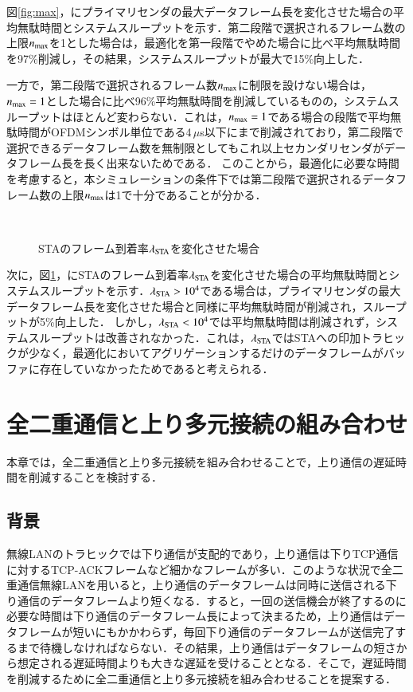 \documentclass[technicalreport]{ieicej}
\begin{document}
		図\ref{fig:max}，にプライマリセンダの最大データフレーム長を変化させた場合の平均無駄時間とシステムスループットを示す．第二段階で選択されるフレーム数の上限$n_{\rm max}$を1とした場合は，最適化を第一段階でやめた場合に比べ平均無駄時間を97\%削減し，その結果，システムスループットが最大で15\%向上した．
		\par
		一方で，第二段階で選択されるフレーム数$n_{\rm max}$に制限を設けない場合は，$n_{\rm max}=1$とした場合に比べ96\%平均無駄時間を削減しているものの，システムスループットはほとんど変わらない．これは，$n_{\rm max}=1$である場合の段階で平均無駄時間がOFDMシンボル単位である4\,$\mu$s以下にまで削減されており，第二段階で選択できるデータフレーム数を無制限としてもこれ以上セカンダリセンダがデータフレーム長を長く出来ないためである．
		このことから，最適化に必要な時間を考慮すると，本シミュレーションの条件下では第二段階で選択されるデータフレーム数の上限$n_{\rm max}$は1で十分であることが分かる．
		\par
		\begin{figure}[t]
			\centering
			\\
			\caption{STAのフレーム到着率$\lambda_{\rm STA}$を変化させた場合}
			\label{fig:lmd}
		\end{figure}
		次に，図\ref{fig:lmd}，にSTAのフレーム到着率$\lambda_{\rm STA}$を変化させた場合の平均無駄時間とシステムスループットを示す．$\lambda_{\rm STA}>10^4$である場合は，プライマリセンダの最大データフレーム長を変化させた場合と同様に平均無駄時間が削減され，スループットが5\%向上した．
		しかし，$\lambda_{\rm STA}<10^4$では平均無駄時間は削減されず，システムスループットは改善されなかった．これは，$\lambda_{\rm STA}$ではSTAへの印加トラヒックが少なく，最適化においてアグリゲーションするだけのデータフレームがバッファに存在していなかったためであると考えられる．

\section{全二重通信と上り多元接続の組み合わせ\label{sec:ofdma}}
本章では，全二重通信と上り多元接続を組み合わせることで，上り通信の遅延時間を削減することを検討する．
	\subsection{背景}
	無線LANのトラヒックでは下り通信が支配的であり，上り通信は下りTCP通信に対するTCP-ACKフレームなど細かなフレームが多い．このような状況で全二重通信無線LANを用いると，上り通信のデータフレームは同時に送信される下り通信のデータフレームより短くなる．すると，一回の送信機会が終了するのに必要な時間は下り通信のデータフレーム長によって決まるため，上り通信はデータフレームが短いにもかかわらず，毎回下り通信のデータフレームが送信完了するまで待機しなければならない．その結果，上り通信はデータフレームの短さから想定される遅延時間よりも大きな遅延を受けることとなる．そこで，遅延時間を削減するために全二重通信と上り多元接続を組み合わせることを提案する．
\end{document}
